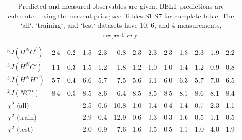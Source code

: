 \documentclass[journal=jacsat,manuscript=article]{achemso}
\begin{document}
\begin{table}
\begin{tabular}{lrrrrrrrrrrrr}
$^3J(H^NC^\beta)$     &  2.4 &          0.2 &      1.5 &             2.3 &      0.8 &             2.3 &                2.3 &                       2.3 &       1.8 &              2.3 &     1.9 &            2.2 \\
$^3J(H^NC\prime)$ &  1.1 &          0.3 &      1.5 &             1.2 &      1.8 &             1.2 &                1.0 &                       1.0 &       1.4 &              1.2 &     0.9 &            0.8 \\
$^3J(H^NH^\alpha)$     &  5.7 &          0.4 &      6.6 &             5.7 &      7.5 &             5.6 &                6.1 &                       6.0 &       6.3 &              5.7 &     7.0 &            6.5 \\
$^2J(NC^\alpha)$      &  8.4 &          0.5 &      8.5 &             8.6 &      6.4 &             8.5 &                8.5 &                       8.5 &       8.1 &              8.6 &     8.1 &            8.4 \\
$\chi^2$ (all)                           &    &            &      2.5 &             0.6 &     10.8 &             1.0 &                0.4 &                       0.4 &       1.4 &              0.7 &     2.3 &            1.1 \\
$\chi^2$ (train)                         &    &            &      2.9 &             0.4 &     12.9 &             0.6 &                0.3 &                       0.3 &       1.6 &              0.5 &     1.1 &            0.5 \\
$\chi^2$ (test)                          &    &            &      2.0 &             0.9 &      7.6 &             1.6 &                0.5 &                       0.5 &       1.1 &              1.0 &     4.0 &            1.9 \\
\bottomrule
\end{tabular}
\caption{
Predicted and measured observables are given.  BELT predictions are calculated using the maxent prior; see Tables S1-S7 for complete table.  The `all`, `training`, and `test` datasets have 10, 6, and 4 measurements, respectively.  
}
\label{table:Predictions}
\end{table}

\clearpage



\end{document}
